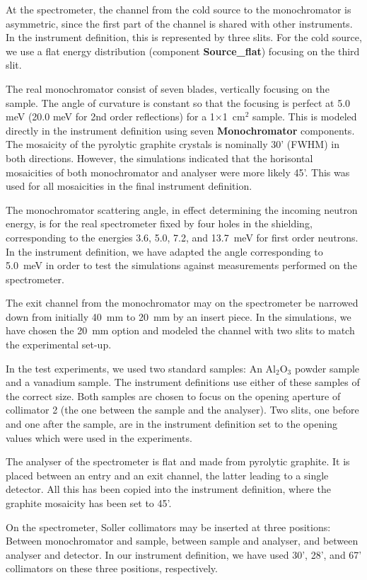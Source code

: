 At the spectrometer, the channel from the cold source 
to the monochromator is asymmetric, since the first
part of the channel is shared with other instruments.
In the instrument definition, this is represented by
three slits.
For the cold source, we use a flat energy
distribution (component {\bf Source\_flat}) 
focusing on the third slit.

The real monochromator consist of seven blades, vertically focusing on
the sample. The angle of curvature is constant so that the focusing is
perfect at 5.0 meV (20.0 meV for 2nd order reflections) for a 1$\times$1~cm$^2$
sample. This is modeled directly in the instrument definition using
seven {\bf Monochromator} components. The mosaicity of the pyrolytic
graphite crystals is nominally 30' (FWHM) in both directions.  However, the
simulations indicated that the horisontal mosaicities of both
monochromator and analyser were more likely 45'. This was used for all
mosaicities in the final instrument definition.

The monochromator scattering angle, in effect determining the incoming
neutron energy, is for the real spectrometer fixed by four holes in the
shielding, corresponding to the energies 3.6, 5.0, 7.2, and 13.7~meV for
first order neutrons.  In the instrument definition, we have adapted the
angle corresponding to 5.0~meV in order to test the simulations against
measurements performed on the spectrometer.

The exit channel from the monochromator may 
on the spectrometer be narrowed down from initially 40~mm
to 20~mm by an insert piece. In the simulations, we have chosen
the 20~mm option and modeled the channel with two slits to match
the experimental set-up.

In the test experiments, we used two standard samples:
An Al$_2$O$_3$ powder sample and a vanadium sample. The instrument
definitions use either of these samples of the correct
size. Both samples are chosen to focus on the opening aperture of
collimator 2 (the one between the sample and the analyser).
Two slits, one before and one after the sample,
are in the instrument definition set to the opening values which
were used in the experiments.

The analyser of the spectrometer is flat and made from 
pyrolytic graphite. It is placed between an entry and 
an exit channel, the latter leading to a single detector.
All this has been copied into the instrument definition,
where the graphite mosaicity has been set to 45'.

On the spectrometer, Soller collimators may be inserted
at three positions: Between monochromator and sample,
between sample and analyser, and between analyser and detector.
In our instrument definition, we have used 30', 28', and 67' collimators
on these three positions, respectively.


